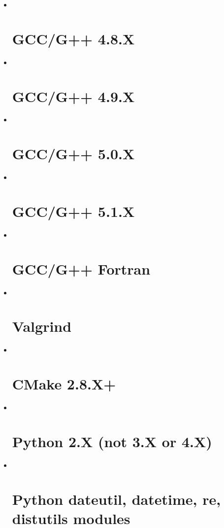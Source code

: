 \documentclass[a4paper,11pt,twoside,pdftex,draft]{article}
\begin{document}
\begin{itemize}
\item ~
  \hypertarget{gccg-4.8.x}{%
  \section[GCC/G++
  4.8.X]{\texorpdfstring{\protect\hypertarget{anchor-10}{}{}GCC/G++
  4.8.X}{GCC/G++ 4.8.X}}\label{gccg-4.8.x}}
\item ~
  \hypertarget{gccg-4.9.x}{%
  \section{GCC/G++ 4.9.X}\label{gccg-4.9.x}}
\item ~
  \hypertarget{gccg-5.0.x}{%
  \section{GCC/G++ 5.0.X}\label{gccg-5.0.x}}
\item ~
  \hypertarget{gccg-5.1.x}{%
  \section{GCC/G++ 5.1.X}\label{gccg-5.1.x}}
\item ~
  \hypertarget{gccg-fortran}{%
  \section{\texorpdfstring{GCC/G++ Fortran
  }{GCC/G++ Fortran }}\label{gccg-fortran}}
\item ~
  \hypertarget{valgrind}{%
  \section{Valgrind}\label{valgrind}}
\item ~
  \hypertarget{cmake-2.8.x-1}{%
  \section{CMake 2.8.X+}\label{cmake-2.8.x-1}}
\item ~
  \hypertarget{python-2.x-not-3.x-or-4.x}{%
  \section{Python 2.X (not 3.X or
  4.X)}\label{python-2.x-not-3.x-or-4.x}}
\item ~
  \hypertarget{python-dateutil-datetime-re-distutils-modules}{%
  \section{Python dateutil, datetime, re, distutils
  modules}\label{python-dateutil-datetime-re-distutils-modules}}
\end{itemize}
\end{document}
